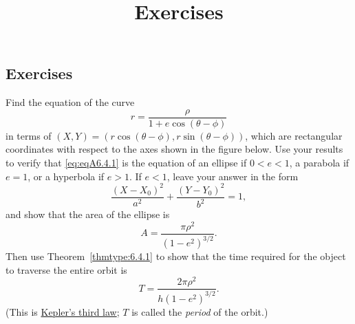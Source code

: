 \documentclass{ximera}
\title{Exercises} \license{CC BY-NC-SA 4.0}
\begin{document}
\begin{abstract}
\end{abstract}
\maketitle

\begin{onlineOnly}
\section*{Exercises}
\end{onlineOnly}


\begin{problem}\label{exer:6.4.1}
Find the equation of the curve
\begin{equation}\label{eq:eqA6.4.1}
r=\frac{\rho}{1+e\cos(\theta-\phi)}
\end{equation}
in terms of
$(X,Y)=\left(r\cos(\theta-\phi),r\sin(\theta-\phi)\right)$,
which are rectangular coordinates with respect to the axes shown in the
figure below. %
Use your results to verify that
\ref{eq:eqA6.4.1}
is the equation of an ellipse if $0<e<1$, a parabola if $e=1$,
or a hyperbola if $e>1$. If $e<1$, leave your answer in
the form
$$
 \frac{(X-X_0)^2}{a^2}+\frac{(Y-Y_0)^2}{b^2}=1,
$$
and show that the area of the ellipse is
$$
A=\frac{\pi\rho^2}{(1-e^2)^{3/2}}.
$$
Then use Theorem~\ref{thmtype:6.4.1} to show that the time required for
the object to traverse the entire orbit is
$$
T=\frac{2\pi\rho^2}{h(1-e^2)^{3/2}}.
$$
(This is
\href{http://www-history.mcs.st-and.ac.uk/Mathematicians/Kepler.html}
{Kepler's third law};   $T$ is called the
\emph{period} of the orbit.)

\begin{center}
\end{center}

\end{problem}
\end{document}
